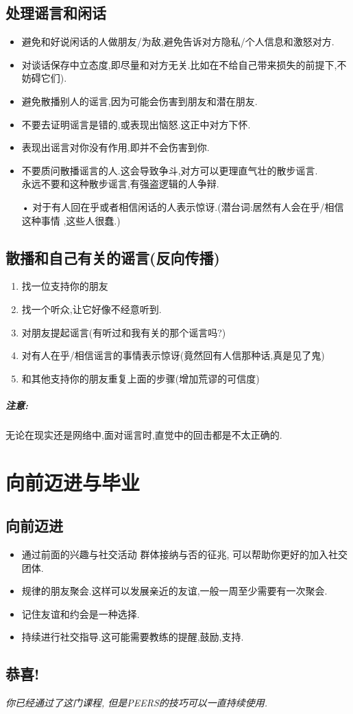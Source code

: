 \documentclass[UTF8]{article}
\newcommand{\warn}{\subparagraph*{注意:}}
\newcommand{\Dot}{•}
\newcommand{\dash}{–}
\begin{document}
\subsection{处理谣言和闲话}
\begin{itemize}[label=\dash]
    \item 避免和好说闲话的人做朋友/为敌,避免告诉对方隐私/个人信息和激怒对方.
    \item 对谈话保存中立态度,即尽量和对方无关.比如在不给自己带来损失的前提下,不妨碍它们).
    \item 避免散播别人的谣言,因为可能会伤害到朋友和潜在朋友.
    \item 不要去证明谣言是错的,或表现出恼怒.这正中对方下怀.
    \item 表现出谣言对你没有作用,即并不会伤害到你.
    \item 不要质问散播谣言的人.这会导致争斗,对方可以更理直气壮的散步谣言.\\ 永远不要和这种散步谣言,有强盗逻辑的人争辩.
    \item[\Dot] 对于有人回在乎或者相信闲话的人表示惊讶.(潜台词:居然有人会在乎/相信这种事情 ,这些人很蠢.)
\end{itemize}
\subsection{散播和自己有关的谣言(反向传播)}
\begin{enumerate}
    \item 找一位支持你的朋友
    \item 找一个听众,让它好像不经意听到.
    \item 对朋友提起谣言(有听过和我有关的那个谣言吗?)
    \item 对有人在乎/相信谣言的事情表示惊讶(竟然回有人信那种话,真是见了鬼)
    \item 和其他支持你的朋友重复上面的步骤(增加荒谬的可信度)
\end{enumerate}
\warn 无论在现实还是网络中,面对谣言时,直觉中的回击都是不太正确的.

\section{向前迈进与毕业}
\subsection{向前迈进}
\begin{itemize}
    \item 通过前面的兴趣与社交活动 群体接纳与否的征兆, 可以帮助你更好的加入社交团体.
    \item 规律的朋友聚会.这样可以发展亲近的友谊,一般一周至少需要有一次聚会.
    \item 记住友谊和约会是一种选择.
    \item 持续进行社交指导.这可能需要教练的提醒,鼓励,支持.
\end{itemize}
\subsection{恭喜!}\emph{你已经通过了这门课程, 但是PEERS的技巧可以一直持续使用.}
\end{document}
